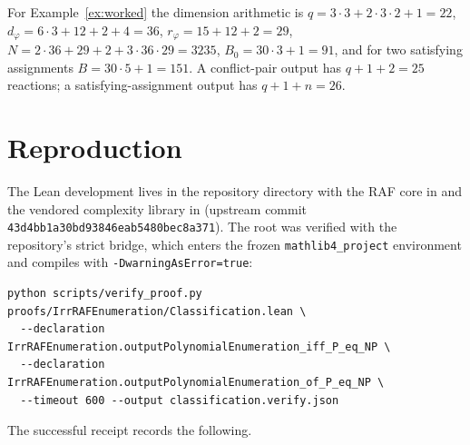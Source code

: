 \documentclass[11pt,a4paper]{article}
\theoremstyle{plain}
\theoremstyle{definition}
\theoremstyle{remark}
\begin{document}
For Example~\ref{ex:worked} the dimension arithmetic is $q=3\cdot3+2\cdot3\cdot2+1=22$, $d_\varphi=6\cdot3+12+2+4=36$, $r_\varphi=15+12+2=29$, $N=2\cdot36+29+2+3\cdot36\cdot29=3235$, $B_0=30\cdot3+1=91$, and for two satisfying assignments $B=30\cdot5+1=151$. A conflict-pair output has $q+1+2=25$ reactions; a satisfying-assignment output has $q+1+n=26$.

\section{Reproduction}\label{app:repro}

The Lean development lives in the repository directory  with the RAF core in  and the vendored complexity library in  (upstream commit \texttt{43d4bb1a30bd9384\allowbreak 6eab5480bec8a371}). The root was verified with the repository's strict bridge, which enters the frozen \texttt{mathlib4\_project} environment and compiles with \texttt{-DwarningAsError=true}:
\begin{small}\begin{verbatim}
python scripts/verify_proof.py proofs/IrrRAFEnumeration/Classification.lean \
  --declaration IrrRAFEnumeration.outputPolynomialEnumeration_iff_P_eq_NP \
  --declaration IrrRAFEnumeration.outputPolynomialEnumeration_of_P_eq_NP \
  --timeout 600 --output classification.verify.json
\end{verbatim}\end{small}
The successful receipt records the following.
\end{document}
